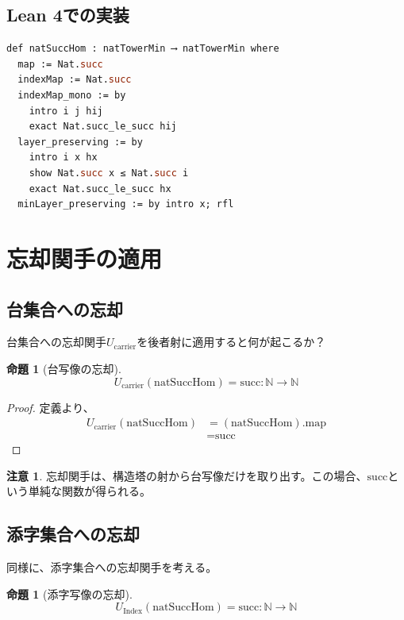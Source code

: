 \documentclass[a4paper,12pt]{article}
\theoremstyle{definition}
\newtheorem{proposition}[definition]{命題}
\newtheorem{remark}[definition]{注意}
\begin{document}
\subsection{Lean 4での実装}

\begin{lstlisting}[style=leanstyle, language=ML]
def natSuccHom : natTowerMin ⟶ natTowerMin where
  map := Nat.succ
  indexMap := Nat.succ
  indexMap_mono := by
    intro i j hij
    exact Nat.succ_le_succ hij
  layer_preserving := by
    intro i x hx
    show Nat.succ x ≤ Nat.succ i
    exact Nat.succ_le_succ hx
  minLayer_preserving := by intro x; rfl
\end{lstlisting}

\section{忘却関手の適用}

\subsection{台集合への忘却}

台集合への忘却関手$U_{\text{carrier}}$を後者射に適用すると何が起こるか？

\begin{proposition}[台写像の忘却]\label{prop:forget_carrier_succ}
\[
U_{\text{carrier}}(\text{natSuccHom}) = \text{succ} : \mathbb{N} \to \mathbb{N}
\]
\end{proposition}

\begin{proof}
定義より、
\begin{align*}
U_{\text{carrier}}(\text{natSuccHom}) &= (\text{natSuccHom}).\text{map} \\
&= \text{succ}
\end{align*}
\end{proof}

\begin{remark}
忘却関手は、構造塔の射から台写像だけを取り出す。この場合、$\text{succ}$という単純な関数が得られる。
\end{remark}

\subsection{添字集合への忘却}

同様に、添字集合への忘却関手を考える。

\begin{proposition}[添字写像の忘却]\label{prop:forget_index_succ}
\[
U_{\text{Index}}(\text{natSuccHom}) = \text{succ} : \mathbb{N} \to \mathbb{N}
\]
\end{proposition}
\end{document}
